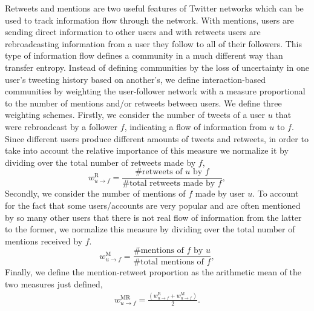 Retweets and mentions are two useful features of Twitter networks which can be used to track information flow through the network.
With mentions, users are sending direct information to other users and with retweets users are rebroadcasting information from a user they follow to all of their followers.
This type of information flow defines a community in a much different way than transfer entropy. Instead of defining communities by the loss of uncertainty in one user's tweeting history based on another's, we define interaction-based communities by weighting the user-follower network with a measure proportional to the number of mentions and/or retweets between users. 
We define three weighting schemes. Firstly, we consider the number of tweets of a user $u$ that were rebroadcast by a follower $f$, indicating a flow of information from $u$ to $f$. Since different users produce different amounts of tweets and retweets, in order to take into account the relative importance of this measure we normalize it by dividing over the total number of retweets made by $f$,
\begin{equation}
w_{u \to f}^{\text{R}}=\frac{\mbox{\# retweets of }u \mbox{ by }f}{\mbox{\# total retweets made by }f},
\end{equation}
Secondly, we consider the number of mentions of $f$ made by user $u$. To account for the fact that some users/accounts are very popular and are often mentioned by so many other users that there is not real flow of information from the latter to the former, we normalize this measure by dividing over the total number of mentions received by $f$.
\begin{equation}
w_{u \to f}^{\text{M}} = \frac{\mbox{\# mentions of }f \mbox{ by }u}{\mbox{\# total mentions of }f},
\end{equation}
Finally, we define the mention-retweet proportion as the arithmetic mean of the two measures just defined,
\begin{align}
	w_{u \to f}^{\text{MR}} = \frac{(w_{u \to f}^{\text{R}}+w_{u \to f}^{\text{M}})}{2}. \label{Eqn-EW-interaction}
\end{align} 

